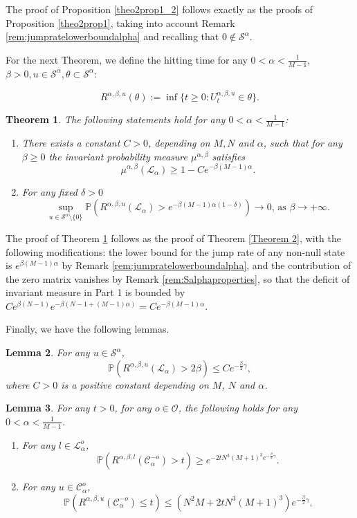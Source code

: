 \documentclass[11pt]{article}
\newtheorem{theorem}{Theorem}
\newtheorem{lemma}[theorem]{Lemma}
\theoremstyle{definition}
\newcommand{\st}{\mathcal{S}}
\newcommand{\opn}{\mathcal{O}}
\def\P{{\mathbb P}}
\begin{document}
The proof of Proposition \ref{theo2prop1_2} follows exactly as the proofs of Proposition \ref{theo2prop1}, taking into account Remark \ref{rem:jumpratelowerboundalpha} and recalling that $0\not\in \mathcal{S}^{\alpha}$.

For the next Theorem, we define the hitting time for any $0<\alpha<\frac{1}{M-1}$, $\beta>0, u\in\mathcal{S}^{\alpha}, \theta \subset\mathcal{S}^{\alpha}$:

$$
    R^{\alpha,\beta,u}(\theta):=\inf\{t\geq0:U^{\alpha,\beta,u}_t\in\theta\}.
$$
\begin{theorem}\label{Theorem 2_2} 
The following statements hold for any $0<\alpha<\frac{1}{M-1}$:
\begin{enumerate}
    \item There exists a constant $C>0$, depending on $M,N$ and $\alpha$, such that for any $\beta\geq 0$ the invariant probability measure $\mu^{\alpha,\beta}$ satisfies
            \[\mu^{\alpha,\beta}(\mathcal{L}_{\alpha})\geq 1-Ce^{-\beta(M-1)\alpha}. \]
\item For any fixed $\delta>0$
\[\sup_{u\in\mathcal{S}^{\alpha}\setminus\{0\}}\mathbb{P}\left(R^{\alpha,\beta, u}(\mathcal{L}_{\alpha})>e^{-\beta(M-1)\alpha(1-\delta)} \right)\rightarrow 0\text{, as }\beta\rightarrow +\infty. \]
    \end{enumerate}
\end{theorem}
 
The proof of Theorem \ref{Theorem 2_2} follows as the proof of Theorem \ref{Theorem 2}, with the following modifications: the lower bound for the jump rate of any non-null state is $e^{\beta(M-1)\alpha}$ by Remark \ref{rem:jumpratelowerboundalpha}, and the contribution of the zero matrix vanishes by Remark \ref{rem:Salphaproperties}, so that the deficit of invariant measure in Part 1 is bounded by $Ce^{\beta(N-1)}e^{-\beta(N-1+(M-1)\alpha)}=Ce^{-\beta(M-1)\alpha}$.

Finally, we have the following lemmas.

\begin{lemma} \label{theo3lemm1_2} For any $u \in \st^{\alpha}$,
    $$
\mathbb{P}(R^{\alpha,\beta,u}(\mathcal{L}_\alpha)>2\beta)
\leq  Ce^{-\frac{\beta}{2}\gamma},
$$
where $C>0$ is a positive constant depending on $M$, $N$ and $\alpha$.
\end{lemma}

\begin{lemma} \label{theo3lemm2_2}For any $t>0$, for any $o \in \opn$, the following holds for any $0<\alpha<\frac{1}{M-1}$.
\begin{enumerate}
    \item For any $l\in \mathcal{L}^{o}_{\alpha}$,
    $$
    \P(R^{\alpha,\beta,l}(\mathcal{C}^{-o}_{\alpha})>t) \geq  e^{-2tN^3(M+1)^3e^{-\frac{\beta}{2}\gamma}}.
    $$
    \item For any $u\in \mathcal{C}^{o}_{\alpha}$,
    $$
    \P(R^{\alpha,\beta,u}(\mathcal{C}^{-o}_{\alpha})\leq t) \leq (N^2M+2tN^3(M+1)^3)e^{-\frac{\beta}{2}\gamma}.
    $$
\end{enumerate}
\end{lemma}
\end{document}
